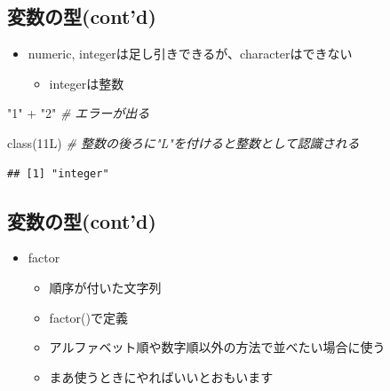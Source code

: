 \documentclass[
]{ltjsarticle}
\newenvironment{Shaded}{\begin{snugshade}}{\end{snugshade}}
\newcommand{\CommentTok}[1]{\textcolor[rgb]{0.56,0.35,0.01}{\textit{#1}}}
\newcommand{\FunctionTok}[1]{\textcolor[rgb]{0.00,0.00,0.00}{#1}}
\newcommand{\NormalTok}[1]{#1}
\newcommand{\SpecialCharTok}[1]{\textcolor[rgb]{0.00,0.00,0.00}{#1}}
\newcommand{\StringTok}[1]{\textcolor[rgb]{0.31,0.60,0.02}{#1}}
\providecommand{\tightlist}{%
  \setlength{\itemsep}{0pt}\setlength{\parskip}{0pt}}
\begin{document}
\hypertarget{ux5909ux6570ux306eux578bcontd}{%
\subsection{変数の型(cont'd)}\label{ux5909ux6570ux306eux578bcontd}}

\begin{itemize}
\tightlist
\item
  numeric, integerは足し引きできるが、characterはできない

  \begin{itemize}
  \tightlist
  \item
    integerは整数
  \end{itemize}
\end{itemize}

\begin{Shaded}
\begin{Highlighting}[]
\StringTok{"1"} \SpecialCharTok{+} \StringTok{"2"} \CommentTok{\# エラーが出る}
\end{Highlighting}
\end{Shaded}

\begin{Shaded}
\begin{Highlighting}[]
\FunctionTok{class}\NormalTok{(11L) }\CommentTok{\# 整数の後ろに"L"を付けると整数として認識される}
\end{Highlighting}
\end{Shaded}

\begin{verbatim}
## [1] "integer"
\end{verbatim}

\hypertarget{ux5909ux6570ux306eux578bcontd-1}{%
\subsection{変数の型(cont'd)}\label{ux5909ux6570ux306eux578bcontd-1}}

\begin{itemize}
\tightlist
\item
  factor

  \begin{itemize}
  \tightlist
  \item
    順序が付いた文字列
  \item
    factor()で定義
  \item
    アルファベット順や数字順以外の方法で並べたい場合に使う
  \item
    まあ使うときにやればいいとおもいます
  \end{itemize}
\end{itemize}
\end{document}
